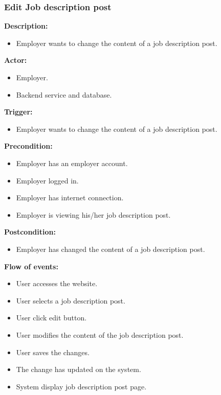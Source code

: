 \documentclass[a4paper]{article}
\begin{document}
        \subsubsection{Edit Job description post}
        \textbf{Description:}
        \begin{itemize}
            \item Employer wants to change the content of a job description post.
        \end{itemize}

        \textbf{Actor:}
        \begin{itemize}
            \item Employer.
            \item Backend service and database.
        \end{itemize}

        \textbf{Trigger:}
        \begin{itemize}
            \item Employer wants to change the content of a job description post.
        \end{itemize}

        \textbf{Precondition:}
        \begin{itemize}
            \item Employer has an employer account.
            \item Employer logged in.
            \item Employer has internet connection.
            \item Employer is viewing his/her job description post.
        \end{itemize}

        \textbf{Postcondition:}
        \begin{itemize}
            \item Employer has changed the content of a job description post.
        \end{itemize}

        \textbf{Flow of events:}
        \begin{itemize}
            \item User accesses the website.
            \item User selects a job description post.
            \item User click edit button.
            \item User modifies the content of the job description post.
            \item User saves the changes.
            \item The change has updated on the system.
            \item System display job description post page.
        \end{itemize}
\end{document}
